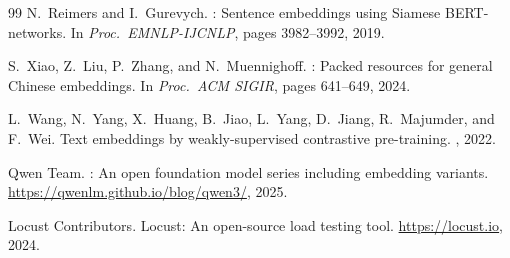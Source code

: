 \documentclass[sigconf]{acmart}
\begin{document}
\begin{thebibliography}{99}
N.~Reimers and I.~Gurevych.
: Sentence embeddings using {Siamese}
  {BERT}-networks.
\newblock In {\em Proc.\ EMNLP-IJCNLP}, pages 3982--3992, 2019.

S.~Xiao, Z.~Liu, P.~Zhang, and N.~Muennighoff.
: Packed resources for general {C}hinese embeddings.
\newblock In {\em Proc.\ ACM SIGIR}, pages 641--649, 2024.

L.~Wang, N.~Yang, X.~Huang, B.~Jiao, L.~Yang, D.~Jiang, R.~Majumder,
  and F.~Wei.
\newblock Text embeddings by weakly-supervised contrastive pre-training.
, 2022.

{Qwen Team}.
: An open foundation model series including embedding
  variants.
\newblock \url{https://qwenlm.github.io/blog/qwen3/}, 2025.

{Locust Contributors}.
\newblock Locust: An open-source load testing tool.
\newblock \url{https://locust.io}, 2024.

\end{thebibliography}
\end{document}
